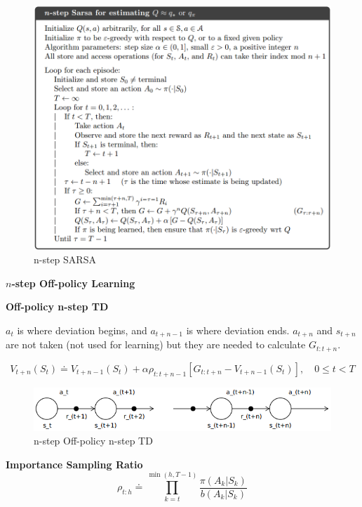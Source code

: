 \documentclass{article}
\begin{document}
\begin{figure}[h]
\includegraphics[scale=0.4]{nstep_sarsa}
\centering
\caption{n-step SARSA}
\end{figure}
    
\noindent
\textbf{$n$-step Off-policy Learning}

\noindent
\textbf{Off-policy n-step TD}

\noindent
$a_{t}$ is where deviation begins, and $a_{t+n-1}$ is where deviation ends.
$a_{t+n}$ and $s_{t+n}$ are not taken (not used for learning) but they are
needed to calculate $G_{t:t+n}$.

\begin{equation}
V_{t+n}\left(S_{t}\right) \doteq V_{t+n-1}\left(S_{t}\right)+\alpha \rho_{t: t+n-1}\left[G_{t: t+n}-V_{t+n-1}\left(S_{t}\right)\right], \quad 0 \leq t<T
\end{equation}
\begin{figure}[h]
\includegraphics[scale=0.4]{offpolicy_nstep_td_diagram}
\centering
\caption{n-step Off-policy n-step TD}
\end{figure}

\newpage
\noindent
\textbf{Importance Sampling Ratio}
\begin{equation}
\rho_{t: h} \doteq \prod_{k=t}^{\min (h, T-1)} \frac{\pi\left(A_{k} | S_{k}\right)}{b\left(A_{k} | S_{k}\right)}
\end{equation}
\end{document}
